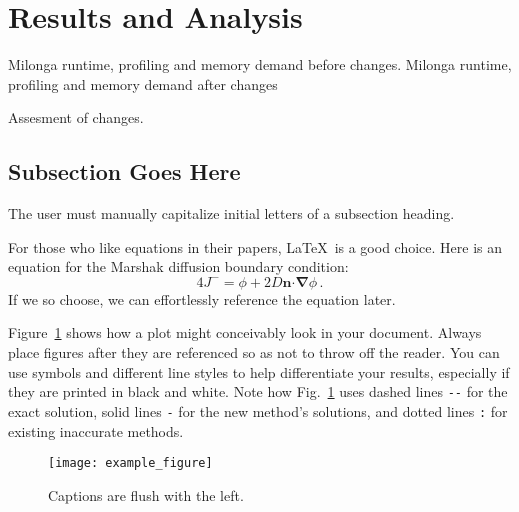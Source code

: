 \documentclass{anstrans}
\renewcommand{\vec}[1]{\bm{#1}} %
\newcommand{\vd}{\bm{\cdot}} %
\newcommand{\grad}{\vec{\nabla}} %
\begin{document}
\section{Results and Analysis}

Milonga runtime, profiling and memory demand before changes.
Milonga runtime, profiling and memory demand after changes

Assesment of changes.

\subsection{Subsection Goes Here}
The user must manually capitalize initial letters of a subsection heading.

For those who like equations in their papers, \LaTeX\ is a good choice. Here is
an equation for the Marshak diffusion boundary condition:
\begin{equation} \label{eq:marshak}
  4 J^- = \phi + 2 D \vec{n} \vd \grad \phi \,.
\end{equation}
If we so choose, we can effortlessly reference the equation later.

Figure~\ref{fig:voltage} shows how a plot might conceivably look in your
document. Always place figures after they are referenced so as not to throw
off the reader. You can use symbols and different line styles to help
differentiate your results, especially if they are printed in black and white.
Note how Fig.~\ref{fig:voltage} uses dashed lines \verb|--| for the exact
solution, solid lines \verb|-| for the new method's solutions, and dotted lines
\verb|:| for existing inaccurate methods.
\begin{figure}[ht] %
  \centering
  \texttt{[image: example\_figure]}
  \caption{Captions are flush with the left.}
  \label{fig:voltage}
\end{figure}
\end{document}
